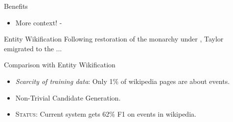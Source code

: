 \begin{frame}{Benefits}
  \begin{itemize}
  \item More context! - 
  \end{itemize}
  \begin{block}{Entity Wikification}
    Following { restoration} of the monarchy under , Taylor emigrated to the ...
  \end{block}
\end{frame}

\begin{frame}{Comparison with Entity Wikification}
  \begin{itemize}[<+->]
  \item \emph{Scarcity of training data}: Only 1\% of wikipedia pages are about events.
  \item Non-Trivial Candidate Generation.
  \item \textsc{Status:} Current system gets 62\% F1 on events in wikipedia.
  \end{itemize}
\end{frame}






